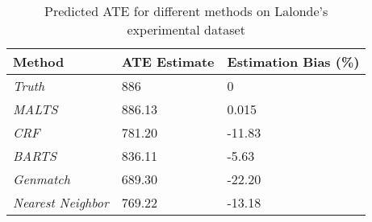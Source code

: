  \begin{table}[h]
 \caption{Predicted ATE for different methods on Lalonde's experimental dataset}
     \centering
        \begin{tabular}{|l|l|l|}
            \hline
            \textbf{Method}           & \textbf{ATE Estimate} & \textbf{Estimation Bias (\%)} \\ \hline
            \textit{Truth}            & 886                   & 0                            \\ \hline
            \textit{MALTS}            & 886.13                & 0.015                        \\ \hline
            \textit{CRF}              & 781.20                & -11.83                       \\ \hline
            \textit{BARTS}            & 836.11                & -5.63                        \\ \hline
            \textit{Genmatch}         & 689.30                & -22.20                       \\ \hline
            \textit{Nearest Neighbor} & 769.22                & -13.18                       \\ \hline
        \end{tabular}
     \label{tab:lalonde}
 \end{table}
